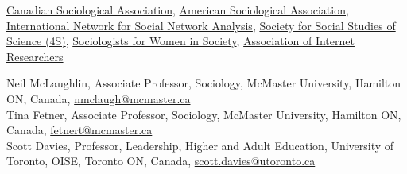 \documentclass[11pt,usenames,dvipsnames]{article}
\begin{document}


\noindent \href{http://www.csa-scs.ca}{Canadian Sociological Association}, \href{http://www.asanet.org}{American Sociological Association}, \href{http://www.insna.org}{International Network for Social Network Analysis}, \href{http://4sonline.org}{Society for Social Studies of Science (4S)}, \href{http://www.socwomen.org}{Sociologists for Women in Society}, \href{http://aoir.org}{Association of Internet Researchers} \\


\noindent Neil McLaughlin, Associate Professor, Sociology, McMaster University, Hamilton ON, Canada, \href{mailto:nmclaugh@mcmaster.ca}{nmclaugh@mcmaster.ca}\\

\noindent Tina Fetner, Associate Professor, Sociology, McMaster University, Hamilton ON, Canada, \href{mailto:fetnert@mcmaster.ca}{fetnert@mcmaster.ca}\\

\noindent Scott Davies, Professor, Leadership, Higher and Adult Education, University of Toronto, OISE, Toronto ON, Canada, \href{mailto:scott.davies@utoronto.ca}{scott.davies@utoronto.ca}
\end{document}
